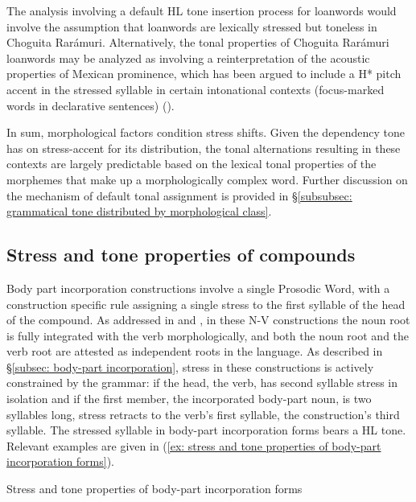 The analysis involving a default HL tone insertion process for loanwords would involve the assumption that  loanwords are lexically stressed but toneless in Choguita Rarámuri. Alternatively, the tonal properties of Choguita Rarámuri loanwords may be analyzed as involving a reinterpretation of the acoustic properties of Mexican  prominence, which has been argued to include a H* pitch accent in the stressed syllable in certain intonational contexts (focus-marked words in declarative sentences) (\citealt{prieto1995tonal}).

In sum, morphological factors condition stress shifts. Given the dependency tone has on stress-accent for its distribution, the tonal alternations resulting in these contexts are largely predictable based on the lexical tonal properties of the morphemes that make up a morphologically complex word. Further discussion on the mechanism of default tonal assignment is provided in §\ref{subsubsec: grammatical tone distributed by morphological class}.

\subsection{Stress and tone properties of compounds}
\label{subsec: stress and tone properties of compounds}

Body part incorporation constructions involve a single Prosodic Word, with a construction specific rule assigning a single stress to the first syllable of the head of the compound. As addressed in  and , in these N-V constructions the noun root is fully integrated with the verb morphologically, and both the noun root and the verb root are attested as independent roots in the language. As described in §\ref{subsec: body-part incorporation}, stress in these constructions is actively constrained by the grammar: if the head, the verb, has second syllable stress in isolation and if the first member, the incorporated body-part noun, is two syllables long, stress retracts to the verb’s first syllable, the construction’s third syllable. The stressed syllable in body-part incorporation forms bears a HL tone. Relevant examples are given in (\ref{ex: stress and tone properties of body-part incorporation forms}).

\ea\label{ex: stress and tone properties of body-part incorporation forms}
{Stress and tone properties of body-part incorporation forms}

